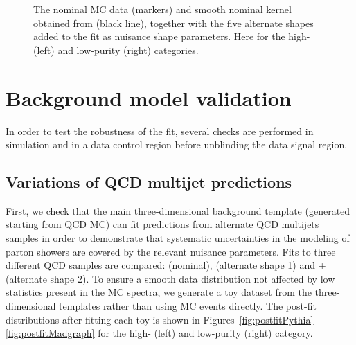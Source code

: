 \begin{figure}[h!]
\caption{The nominal MC data (markers) and smooth nominal kernel obtained from  (black line), together with the five alternate shapes added to the fit as nuisance shape parameters. Here for the high- (left) and low-purity (right) categories.}
\label{fig:searchIII:sys}
\end{figure}
\clearpage

\section{Background model validation}
\label{sec:search3:checks}
In order to test the robustness of the fit, several checks are performed in simulation and in a data control region before unblinding the data signal region.

\subsection{Variations of QCD multijet predictions}
First, we check that the main three-dimensional background template (generated starting from QCD  MC) can fit predictions from alternate QCD multijets samples in order to demonstrate that systematic uncertainties in the modeling of parton showers are covered by the relevant nuisance parameters. Fits to three different QCD samples are compared:  (nominal), \HERWIG{++} (alternate shape 1) and \MADGRAPH{}+ (alternate shape 2).
To ensure a smooth data distribution not affected by low statistics present in the MC spectra, we generate a toy dataset from the three-dimensional templates rather than using MC events directly. The post-fit distributions after fitting each toy is shown in Figures~\ref{fig:postfitPythia}-\ref{fig:postfitMadgraph} for the high- (left) and low-purity (right) category.
